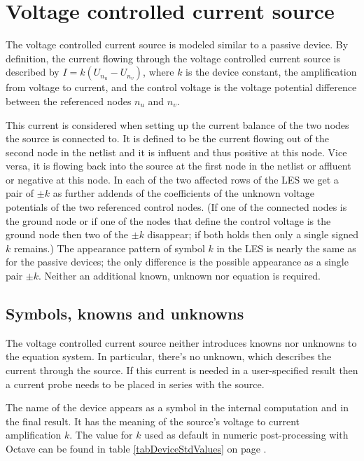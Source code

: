 \section{Voltage controlled current source}

The voltage controlled current source is modeled similar to a passive
device. By definition, the current flowing through the voltage controlled
current source is described by $I = k(U_{n_u} - U_{n_v})$, where $k$ is
the device constant, the amplification from voltage to current, and the
control voltage is the voltage potential difference between the referenced
nodes $n_u$ and $n_v$.

This current is considered when setting up the current balance of the two
nodes the source is connected to. It is defined to be the current flowing
out of the second node in the netlist and it is influent and thus positive
at this node. Vice versa, it is flowing back into the source at the first
node in the netlist or affluent or negative at this node. In each of the
two affected rows of the LES we get a pair of $\pm k$ as further addends
of the coefficients of the unknown voltage potentials of the two
referenced control nodes. (If one of the connected nodes is the ground
node or if one of the nodes that define the control voltage is the ground
node then two of the $\pm k$ disappear; if both holds then only a single
signed $k$ remains.) The appearance pattern of symbol $k$ in the LES is
nearly the same as for the passive devices; the only difference is the
possible appearance as a single pair $\pm k$. Neither an additional known,
unknown nor equation is required.


\subsection{Symbols, knowns and unknowns}

The voltage controlled current source neither introduces knowns nor
unknowns to the equation system. In particular, there's no unknown, which
describes the current through the source. If this current is needed in a
user-specified result then a current probe needs to be placed in series
with the source.

The name of the device appears as a symbol in the internal computation and in
the final result. It has the meaning of the source's voltage to current
amplification $k$. The value for $k$ used as default in numeric
post-processing with Octave can be found in table \ref{tabDeviceStdValues}
on page \pageref{tabDeviceStdValues}.


